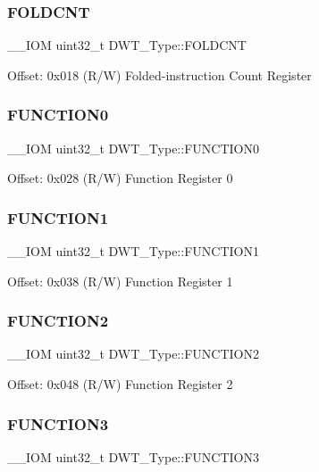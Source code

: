 \subsubsection{\texorpdfstring{FOLDCNT}{FOLDCNT}}
{\footnotesize\ttfamily \+\_\+\+\_\+\+I\+OM uint32\+\_\+t D\+W\+T\+\_\+\+Type\+::\+F\+O\+L\+D\+C\+NT}

Offset\+: 0x018 (R/W) Folded-\/instruction Count Register \mbox{\label{structDWT__Type_a579ae082f58a0317b7ef029b20f52889}} 
\subsubsection{\texorpdfstring{FUNCTION0}{FUNCTION0}}
{\footnotesize\ttfamily \+\_\+\+\_\+\+I\+OM uint32\+\_\+t D\+W\+T\+\_\+\+Type\+::\+F\+U\+N\+C\+T\+I\+O\+N0}

Offset\+: 0x028 (R/W) Function Register 0 \mbox{\label{structDWT__Type_a8dfcf25675f9606aa305c46e85182e4e}} 
\subsubsection{\texorpdfstring{FUNCTION1}{FUNCTION1}}
{\footnotesize\ttfamily \+\_\+\+\_\+\+I\+OM uint32\+\_\+t D\+W\+T\+\_\+\+Type\+::\+F\+U\+N\+C\+T\+I\+O\+N1}

Offset\+: 0x038 (R/W) Function Register 1 \mbox{\label{structDWT__Type_ab1b60d6600c38abae515bab8e86a188f}} 
\subsubsection{\texorpdfstring{FUNCTION2}{FUNCTION2}}
{\footnotesize\ttfamily \+\_\+\+\_\+\+I\+OM uint32\+\_\+t D\+W\+T\+\_\+\+Type\+::\+F\+U\+N\+C\+T\+I\+O\+N2}

Offset\+: 0x048 (R/W) Function Register 2 \mbox{\label{structDWT__Type_a52d4ff278fae6f9216c63b74ce328841}} 
\subsubsection{\texorpdfstring{FUNCTION3}{FUNCTION3}}
{\footnotesize\ttfamily \+\_\+\+\_\+\+I\+OM uint32\+\_\+t D\+W\+T\+\_\+\+Type\+::\+F\+U\+N\+C\+T\+I\+O\+N3}

